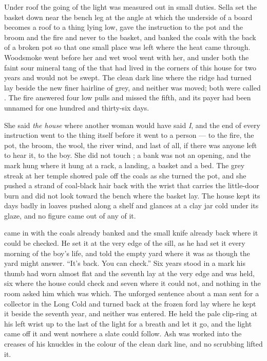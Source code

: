 \scenebreak

Under  roof the going of the light was measured out in small duties. Sella set the basket down near the bench leg at the angle at which the underside of a board becomes a roof to a thing lying low, gave the instruction to the pot and the broom and the fire and never to the basket, and banked the coals with the back of a broken pot so that one small place was left where the heat came through. Woodsmoke went before her and wet wool went with her, and under both the faint sour mineral tang of the  that had lived in the corners of this house for two years and would not be swept. The clean dark line where the ridge had turned lay beside the new finer hairline of grey, and neither was moved; both were called . The fire answered four low pulls and missed the fifth, and its payer had been unnamed for one hundred and thirty-six days.

She said \emph{the house} where another woman would have said \emph{I}, and the end of every instruction went to the thing itself before it went to a person --- to the fire, the pot, the broom, the wool, the river wind, and last of all, if there was anyone left to hear it, to the boy. She did not touch ; a bank was not an opening, and the mark hung where it hung at a rack, a landing, a basket and a bed. The grey streak at her temple showed pale off the coals as she turned the pot, and she pushed a strand of coal-black hair back with the wrist that carries the little-door burn and did not look toward the bench where the basket lay. The house kept its days badly in loaves pushed along a shelf and glances at a clay jar cold under its glaze, and no figure came out of any of it.

 came in with the coals already banked and the small knife already back where it could be checked. He set it at the very edge of the sill, as he had set it every morning of the boy's life, and told the empty yard where it was as though the yard might answer. “It's back. You can check.” Six years stood in a mark his thumb had worn almost flat and the seventh lay at the very edge and was held, six where the house could check and seven where it could not, and nothing in the room asked him which was which. The unforged sentence about a man sent for a collector in the Long Cold and turned back at the frozen ford lay where he kept it beside the seventh year, and neither was entered. He held the pale clip-ring at his left wrist up to the last of the light for a breath and let it go, and the light came off it and went nowhere a slate could follow. Ash was worked into the creases of his knuckles in the colour of the clean dark line, and no scrubbing lifted it.

